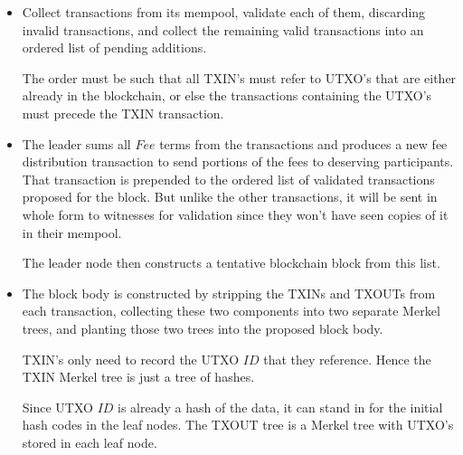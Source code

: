 \documentclass[a4paper, 10pt, conference]{ieeeconf}
\begin{document}
\begin{itemize}
\item{Collect transactions from its mempool, validate each of them, discarding invalid transactions, and collect the remaining valid transactions into an ordered list of pending additions. 

The order must be such that all TXIN's must refer to UTXO's that are either already in the blockchain, or else the transactions containing the UTXO's must precede the TXIN transaction.}
\item{The leader sums all $\mathit{Fee}$ terms from the transactions and produces a new fee distribution transaction to send portions of the fees to deserving participants. That transaction is prepended to the ordered list of validated transactions proposed for the block. But unlike the other transactions, it will be sent in whole form to witnesses for validation since they won't have seen copies of it in their mempool.

The leader node then constructs a tentative blockchain block from this list.}
\item{The block body is constructed by stripping the TXINs and TXOUTs from each transaction, collecting these two components into two separate Merkel trees, and planting those two trees into the proposed block body.

TXIN's only need to record the UTXO $ID$ that they reference. Hence the TXIN Merkel tree is just a tree of hashes.

Since UTXO $ID$ is already a hash of the data, it can stand in for the initial hash codes in the leaf nodes. The TXOUT tree is a Merkel tree with UTXO's stored in each leaf node.

}
\end{itemize}
\end{document}
